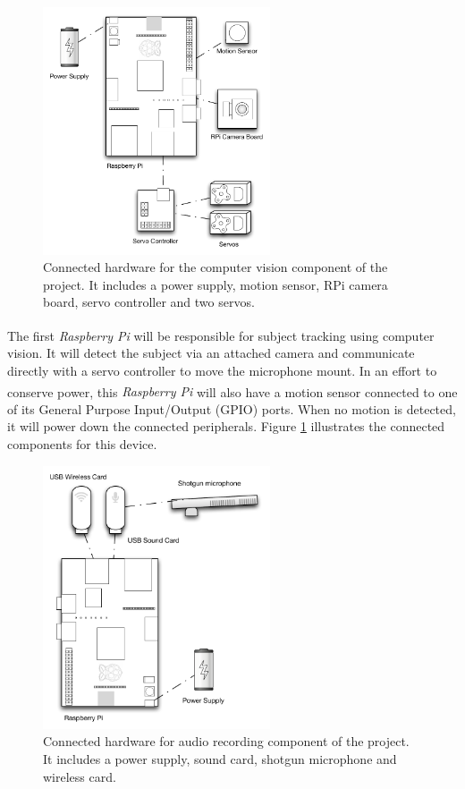 \documentclass[11pt,a4paper,titlepage]{report}
\newcommand{\rpi}{\textit{Raspberry Pi\textsuperscript{\textregistered}}}
\begin{document}
\begin{figure}
\centering
\includegraphics[width=0.6\textwidth]{graphs/rpi_1.pdf}
\caption{Connected hardware for the computer vision component of the project. It includes a power supply, motion sensor, RPi camera board, servo controller and two servos.}
\label{fig:cvhardware}
\end{figure}


The first \rpi\xspace will be responsible for subject tracking using computer vision. It will detect the subject via an attached camera and communicate directly with a servo controller to move the microphone mount. In an effort to conserve power, this \rpi\xspace will also have a motion sensor connected to one of its General Purpose Input/Output (GPIO) ports. When no motion is detected, it will power down the connected peripherals. Figure \ref{fig:cvhardware} illustrates the connected components for this device.


\begin{figure}
\centering
\includegraphics[width=0.6\textwidth]{graphs/rpi_2.pdf}
\caption{Connected hardware for audio recording component of the project. It includes a power supply, sound card, shotgun microphone and wireless card.}
\label{fig:audiohardware}
\end{figure}
\end{document}
